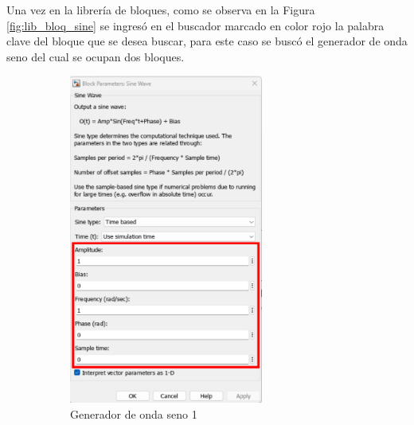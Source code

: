 Una vez en la librería de bloques, como se observa en la Figura \ref{fig:lib_bloq_sine} se ingresó en el buscador marcado en color rojo la palabra clave del bloque que se desea buscar, para este caso se buscó el generador de onda seno del cual se ocupan dos bloques. 

\begin{figure}[htbp]
    \centering
    \begin{subfigure}[b]{0.45\textwidth}
        \centering
        \includegraphics[width=0.7\textwidth]{fig/especifico_2/CASO_ESTUDIO_FILTRO/sinewave_1.pdf}
        \caption{Generador de onda seno 1}
        \label{fig:sine_gen_01}
    \end{subfigure}
    \hfill
    \begin{subfigure}[b]{0.45\textwidth}
        \centering

\end{subfigure}
\end{figure}
